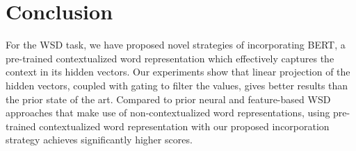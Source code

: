 \documentclass[11pt,a4paper]{article}
\begin{document}
\section{Conclusion}
\label{sec:conclusion}

For the WSD task, we have proposed novel strategies of incorporating BERT, a pre-trained contextualized word representation which effectively captures the context in its hidden vectors. Our experiments show that linear projection of the hidden vectors, coupled with gating to filter the values, gives better results than the prior state of the art. Compared to prior neural and feature-based WSD approaches that make use of non-contextualized word representations, using pre-trained contextualized word representation with our proposed incorporation strategy achieves significantly higher scores.



\end{document}
